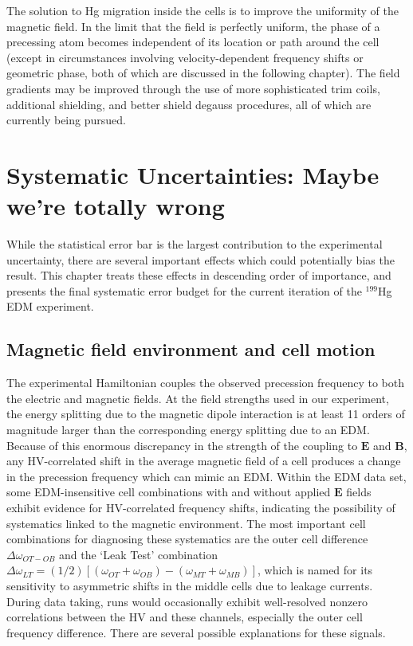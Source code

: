\documentclass [10pt, twoside] {uwthesis}[2012/04/02]
\begin{document}
The solution to Hg migration inside the cells is to improve the uniformity of the magnetic field. In the limit that the field is perfectly uniform, the phase of a precessing atom becomes independent of its location or path around the cell (except in circumstances involving velocity-dependent frequency shifts or geometric phase, both of which are discussed in the following chapter). The field gradients may be improved through the use of more sophisticated trim coils, additional shielding, and better shield degauss procedures, all of which are currently being pursued.

\chapter{Systematic Uncertainties: Maybe we're totally wrong}
\label{SystematicChapter}
While the statistical error bar is the largest contribution to the experimental uncertainty, there are several important effects which could potentially bias the result. This chapter treats these effects in descending order of importance, and presents the final systematic error budget for the current iteration of the $^{199}$Hg EDM experiment.

\section{Magnetic field environment and cell motion}
The experimental Hamiltonian couples the observed precession frequency to both the electric and magnetic fields. At the field strengths used in our experiment, the energy splitting due to the magnetic dipole interaction is at least 11 orders of magnitude larger than the corresponding energy splitting due to an EDM. Because of this enormous discrepancy in the strength of the coupling to $\mathbf{E}$ and $\mathbf{B}$, any HV-correlated shift in the average magnetic field of a cell produces a change in the precession frequency which can mimic an EDM. Within the EDM data set, some EDM-insensitive cell combinations with and without applied $\mathbf{E}$ fields exhibit evidence for HV-correlated frequency shifts, indicating the possibility of systematics linked to the magnetic environment. The most important cell combinations for diagnosing these systematics are the outer cell difference $\Delta\omega_{OT-OB}$ and the `Leak Test' combination $\Delta\omega_{LT} = (1/2)[(\omega_{OT}+\omega_{OB}) - (\omega_{MT}+\omega_{MB})]$, which is named for its sensitivity to asymmetric shifts in the middle cells due to leakage currents. During data taking, runs would occasionally exhibit well-resolved nonzero correlations between the HV and these channels, especially the outer cell frequency difference. There are several possible explanations for these signals.
\end{document}
